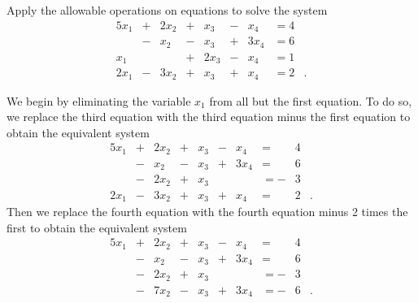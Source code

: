 \label{sec:intro_le_exam}

\ExampleIntro

\begin{example} Apply the allowable operations on equations to solve the system
\begin{alignat*}{5}
{}x_1	 	&{}+{}	&{2}x_2 	&{+}	&{}x_3	&{-}	&{}x_4	&= 4&{}   \\
{}	 	&{}-{}	&{}x_2 	&{-}	&{}x_3	&{+}	&{3}x_4	&= 6&{}   \\
{}x_1 	&{}{}		&{}	 	&{+}	&{2}x_3	&{-}	&{}x_4	&= 1&{}   \\
{2}x_1	 &{}-{}	&{3}x_2 	&{+}	&{}x_3	&{+}	&{}x_4	&= 2&{.}   
\end{alignat*}

\ExampleSolution We begin by eliminating the variable $x_1$ from all but the first equation. To do so, we replace the third equation with the third equation minus the first equation to obtain the equivalent system
\begin{alignat*}{5}
{}x_1	 	&{}+{}	&{2}x_2 	&{+}		&{}x_3	&{-}	&{}x_4	&= {}&4&{}   \\
{}	 	&{}-{}	&{}x_2 	&{-}		&{}x_3	&{+}	&{3}x_4	&= {}&6&{}   \\
{}	 	&{}-{}	&{2}x_2	 &{+}		&{}x_3	&{}	&{}		&= {-}&3&{}   \\
{2}x_1	 &{}-{}	&{3}x_2 	&{+}		&{}x_3	&{+}	&{}x_4	&= {}&2&{.}   
\end{alignat*}
Then we replace the fourth equation with the fourth equation minus 2 times the first to obtain the equivalent system
\begin{alignat*}{5}
{}x_1	 	&{}+{}	&{2}x_2 	&{+}		&{}x_3	&{-}	&{}x_4	&= {}&4&{}   \\
{}	 	&{}-{}	&{}x_2 	&{-}		&{}x_3	&{+}	&{3}x_4	&= {}&6&{}   \\
{}	 	&{}-{}	&{2}x_2	 &{+}		&{}x_3	&{}	&{}		&= {-}&3&{}   \\
{}	 	&{}-{}	&{7}x_2 	&{-}		&{}x_3	&{+}	&{3}x_4	&= {-}&6&{.}   
\end{alignat*}


\end{example}
